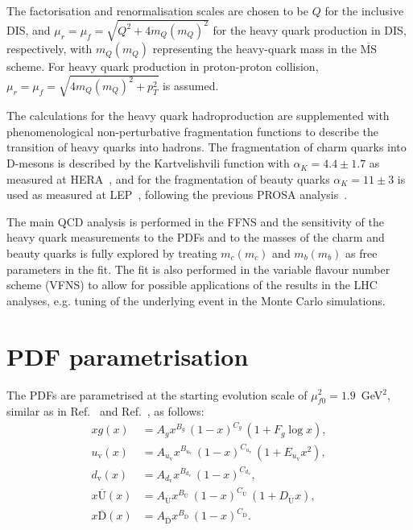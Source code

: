 \documentclass[12pt]{article}
\newcommand{\msbar}{$\overline{\text{MS}}\, $\xspace}
\begin{document}
The factorisation and renormalisation scales are chosen to be $Q$ for the inclusive DIS, and $\mu_r = \mu_f = \sqrt{Q^2 + 4m_Q(m_Q)^2}$ for the heavy quark production in DIS, respectively, with $m_Q(m_Q)$ representing the heavy-quark mass in the \msbar scheme. 
For heavy quark production in proton-proton collision, $\mu_r = \mu_f = \sqrt{4m_Q(m_Q)^2+p_T^2}$ is assumed. 

The calculations for the heavy quark hadroproduction are supplemented with phenomenological non-perturbative fragmentation 
functions to describe the transition of heavy quarks into hadrons. The fragmentation of charm quarks into D-mesons is 
described by the Kartvelishvili function with $\alpha_K = 4.4 \pm 1.7$ as measured at HERA~\cite{Aaron:2008ac,Chekanov:2008ur}, 
and for the fragmentation of beauty quarks $\alpha_K = 11 \pm 3$ is used as measured at LEP~\cite{Nason:1999zj}, following 
the previous PROSA analysis~\cite{Zenaiev:2015rfa}.

The main QCD analysis is performed in the FFNS and the sensitivity of the heavy quark measurements to the PDFs and to the masses 
of the charm and beauty quarks is fully explored by treating $m_c(m_c)$ and $m_b(m_b)$ as free parameters in the fit.
The fit is also performed in the variable flavour number scheme (VFNS) to allow for possible applications of the 
results in the LHC analyses, e.g. tuning of the underlying event in the Monte Carlo simulations.


\section{PDF parametrisation}
\label{sec:pdfparam}

The PDFs are parametrised at the starting evolution scale of $\mu^2_{f0} = 1.9$~GeV$^2$, similar as in Ref.~\cite{Abramowicz:2015mha} and Ref.~\cite{Bonvini:2019wxf}, as follows:
\begin{equation}\begin{aligned}
xg(x) &= A_{g} x^{B_{g}}\,(1-x)^{C_{g}}\, (1 + F_{g} {\log x}),\\
u_\mathrm{v}(x) &= A_{u_\mathrm{v}}x^{B_{u_\mathrm{v}}}\,(1-x)^{C_{u_\mathrm{v}}}\,(1+E_{u_\mathrm{v}}x^2) ,\\
d_\mathrm{v}(x) &= A_{d_\mathrm{v}}x^{B_{d_\mathrm{v}}}\,(1-x)^{C_{d_\mathrm{v}}},\\
x\overline{\mathrm{U}}(x)&= A_{\overline{\mathrm{U}}}x^{B_{\overline{\mathrm{U}}}}\, (1-x)^{C_{\overline{\mathrm{U}}}}\, (1+D_{\overline{\mathrm{U}}}x), \\
x\overline{\mathrm{D}}(x)&= A_{\overline{\mathrm{D}}}x^{B_{\overline{\mathrm{D}}}}\, (1-x)^{C_{\overline{\mathrm{D}}}}.
\end{aligned}
\label{eq:dv}
\end{equation}
\end{document}
